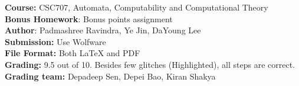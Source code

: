 \documentclass{article}
\begin{document}
\begin{flushleft}
\textbf{Course:} CSC707, Automata, Computability and Computational Theory\\
\textbf{Bonus Homework}: Bonus points assignment\\
\textbf{Author}: Padmashree Ravindra, Ye Jin, DaYoung Lee\\
\textbf{Submission:} Use Wolfware\\
\textbf{File Format:} Both LaTeX and PDF\\
\textbf{Grading:} 9.5 out of 10. Besides few glitches (Highlighted), all steps are correct. \\
\textbf{Grading team:} Depadeep Sen, Depei Bao, Kiran Shakya \\
\end{flushleft}

\begin{center}
\\
\end{center}

\noindent{\hrulefill}
\bigskip
\end{document}
